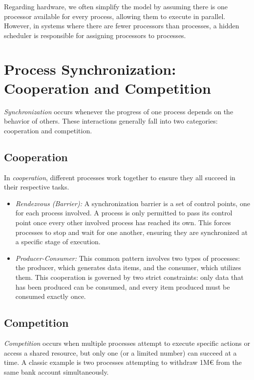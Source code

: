 Regarding hardware, we often simplify the model by assuming there is one processor available for every process, allowing them to execute in parallel. However, in systems where there are fewer processors than processes, a hidden scheduler is responsible for assigning processors to processes.

\section{Process Synchronization: Cooperation and Competition}
\textit{Synchronization} occurs whenever the progress of one process depends on the behavior of others. These interactions generally fall into two categories: cooperation and competition.

\subsection{Cooperation}
In \textit{cooperation}, different processes work together to ensure they all succeed in their respective tasks.
\begin{itemize}
    \item \textit{Rendezvous (Barrier):} A synchronization barrier is a set of control points, one for each process involved. A process is only permitted to pass its control point once every other involved process has reached its own. This forces processes to stop and wait for one another, ensuring they are synchronized at a specific stage of execution.
    \item \textit{Producer-Consumer:} This common pattern involves two types of processes: the producer, which generates data items, and the consumer, which utilizes them. This cooperation is governed by two strict constraints: only data that has been produced can be consumed, and every item produced must be consumed exactly once.
\end{itemize}

\subsection{Competition}
\textit{Competition} occurs when multiple processes attempt to execute specific actions or access a shared resource, but only one (or a limited number) can succeed at a time. A classic example is two processes attempting to withdraw 1M€ from the same bank account simultaneously.

